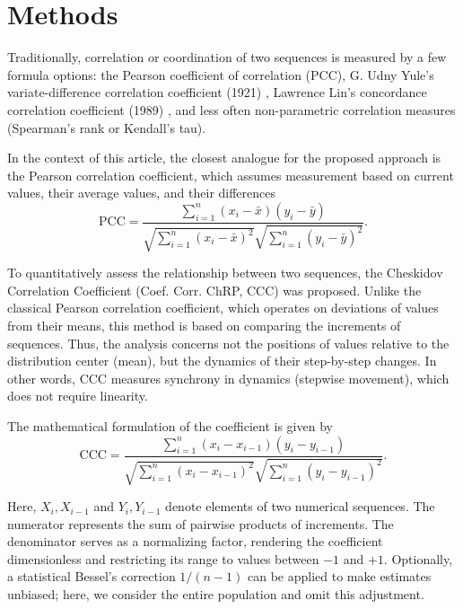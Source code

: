\documentclass[aos]{imsart}
\begin{document}
\section{Methods}

Traditionally, correlation or coordination of two sequences is measured by a few formula options: the Pearson coefficient of correlation (PCC), G. Udny Yule’s variate-difference correlation coefficient (1921) \cite{r1}, Lawrence Lin’s concordance correlation coefficient (1989) \cite{r2}, and less often non-parametric correlation measures (Spearman’s rank or Kendall’s tau).

In the context of this article, the closest analogue for the proposed approach is the Pearson correlation coefficient, which assumes measurement based on current values, their average values, and their differences
\begin{equation}
\text{PCC} = \frac{\sum_{i=1}^n (x_i - \bar{x})(y_i - \bar{y})}{\sqrt{\sum_{i=1}^n (x_i - \bar{x})^2}\sqrt{\sum_{i=1}^n (y_i - \bar{y})^2}}.
\end{equation}

To quantitatively assess the relationship between two sequences, the Cheskidov Correlation Coefficient (Coef. Corr. ChRP, CCC) was proposed. Unlike the classical Pearson correlation coefficient, which operates on deviations of values from their means, this method is based on comparing the increments of sequences. Thus, the analysis concerns not the positions of values relative to the distribution center (mean), but the dynamics of their step-by-step changes. In other words, CCC measures synchrony in dynamics (stepwise movement), which does not require linearity.

The mathematical formulation of the coefficient is given by
\begin{equation}
\text{CCC} = \frac{\sum_{i=1}^n (x_i - x_{i-1})(y_i - y_{i-1})}{\sqrt{\sum_{i=1}^n (x_i - x_{i-1})^2} \sqrt{\sum_{i=1}^n (y_i - y_{i-1})^2}}.
\end{equation}

Here, $X_i, X_{i-1}$ and $Y_i, Y_{i-1}$ denote elements of two numerical sequences. The numerator represents the sum of pairwise products of increments. The denominator serves as a normalizing factor, rendering the coefficient dimensionless and restricting its range to values between $-1$ and $+1$. Optionally, a statistical Bessel’s correction $1/(n-1)$ can be applied to make estimates unbiased; here, we consider the entire population and omit this adjustment.
\end{document}
